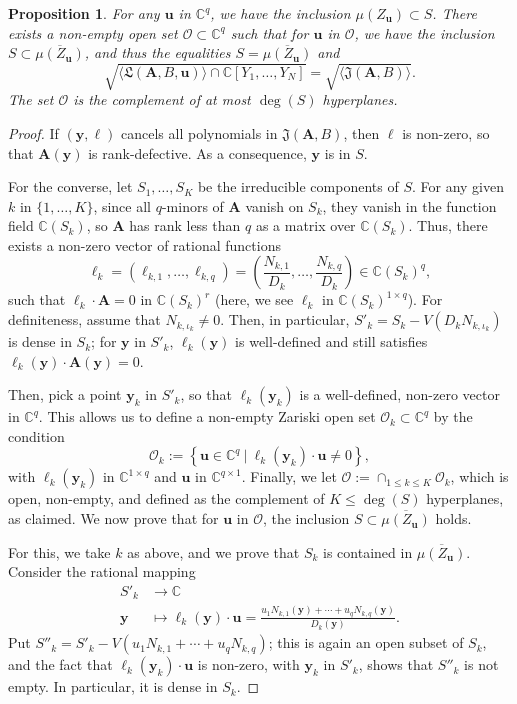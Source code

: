 \documentclass[12pt]{article}
\def\X{S}
\def\frkJ{\mathfrak{J}}
\def\frkL{\mathfrak{L}}
\def\mA{{\bm A}}
\def\C{\mathbb{C}}
\newtheorem{prop}[theorem]{Proposition}
\begin{document}
\begin{prop}\label{prop:projection}
  For any $\bm u$ in $\C^q$, we have the inclusion $\mu(Z_{\bm u})
  \subset \X$. There exists a non-empty open set $\mathscr{O} \subset
  \C^q$ such that for $\bm u$ in $\mathscr{O}$, we have the inclusion
  $\X \subset \overline{\mu(Z_{\bm u})}$, and thus the equalities $\X =
  \overline{\mu(Z_{\bm u})}$ and 
  \[\sqrt{\langle \frkL(\bm A, B,\bm u)\rangle\cap \C[Y_1,\dots,Y_N]} = 
  \sqrt{\langle \frkJ(\bm A, B) \rangle}.\]
  The set $\mathscr{O}$ is the complement of at most $\deg(\X)$ 
  hyperplanes.
\end{prop}
\begin{proof}
  If $(\bm y, \bm \ell)$ cancels all polynomials in ${\frkJ(\bm
    A, B)}$, then $\bm \ell$ is non-zero, so that $\bm A(\bm y)$ is
  rank-defective. As a consequence, $\bm y$ is in $\X$.

  For the converse, let $\X_1,\dots,\X_K$ be the irreducible components
  of $\X$.  For any given $k$ in $\{1,\dots,K\}$, since all $q$-minors
  of $\mA$ vanish on $\X_k$, they vanish in the function field
  $\C(\X_k)$, so $\mA$ has rank less than $q$ as a matrix over
  $\C(\X_k)$. Thus, there exists a non-zero vector of rational
  functions
  \[\bm \ell_k = (\ell_{k,1},\hdots,\ell_{k,q})=\left(\frac{N_{k,1}}{D_k},\hdots,\frac{N_{k,q}}{D_k}\right)\in \C(\X_k)^q,\]
  such that $\bm \ell_k  \cdot \bm A = 0$ in $\C(\X_k)^r$ 
(here, we see $\bm \ell_k$ in $\C(\X_k)^{1 \times q}$).
  For definiteness, assume that $N_{k,\iota_k} \ne 0.$ Then, in particular,
  $\X'_k = \X_k - V( D_k N_{k,\iota_k})$ is dense in $\X_k$; for 
  $\bm y$ in $\X'_k$, $\bm\ell_k(\bm y)$ is well-defined and still
  satisfies $\bm \ell_k(\bm y) \cdot \bm A(\bm y) = 0$.
  
  Then, pick a point $\bm y_k$ in $\X'_k$, so that
  $\bm \ell_k(\bm y_k)$ is a well-defined, non-zero vector in
  $\C^q$. This allows us to define a non-empty Zariski open set
  $\mathscr{O}_k \subset \C^q$ by the condition
  \[
  \mathscr{O}_k := 
  \left\{\bm u \in \C^q~|~ \bm \ell_k(\bm y_k) \cdot \bm u \ne 0\right \},
  \]
  with $\bm \ell_k(\bm y_k)$ in $\C^{1 \times q}$ and $\bm u$ in
  $\C^{q \times 1}$.  Finally, we let $\mathscr{O} := \cap_{1 \le k
    \le K} \mathscr{O}_{k}$, which is open, non-empty, and defined 
  as the complement of $K \le \deg(\X)$ hyperplanes, as claimed. We now prove
  that for $\bm u$ in $\mathscr{O}$, the inclusion $\X \subset
  \overline{\mu(Z_{\bm u})}$ holds.

  For this, we take $k$ as above, 
  and we prove that $\X_k$ is contained in $\overline{\mu(Z_{\bm u})}$.
  Consider the rational mapping 
  \begin{align*}
    \X'_k  &\rightarrow \C\\    
    \bm y &\mapsto  \bm \ell_k(\bm y)\cdot \bm u = \frac{ u_1 N_{k,1}(\bm y) + \cdots + u_q N_{k,q}(\bm y)}{D_k(\bm y)}.    
  \end{align*}
  Put $\X''_k = \X'_k - V(u_1 N_{k,1} + \cdots + u_q N_{k,q})$; this is
  again an open subset of $\X_k$, and the fact that $ \bm
  \ell_k(\bm y_k)\cdot \bm u$ is non-zero, with $\bm y_k$ in $\X'_k$, shows that
  $\X''_k$ is not empty. In particular, it is dense in $\X_k$.   


\end{proof}
\end{document}

